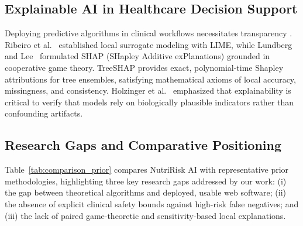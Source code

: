 \documentclass[conference]{IEEEtran}
\begin{document}
\subsection{Explainable AI in Healthcare Decision Support}
Deploying predictive algorithms in clinical workflows necessitates transparency \cite{topol2019high, amann2020explainability}. Ribeiro et al.~\cite{ribeiro2016why} established local surrogate modeling with LIME, while Lundberg and Lee~\cite{lundberg2017unified} formulated SHAP (SHapley Additive exPlanations) grounded in cooperative game theory. TreeSHAP provides exact, polynomial-time Shapley attributions for tree ensembles, satisfying mathematical axioms of local accuracy, missingness, and consistency. Holzinger et al.~\cite{holzinger2019causability} emphasized that explainability is critical to verify that models rely on biologically plausible indicators rather than confounding artifacts.

\subsection{Research Gaps and Comparative Positioning}
Table~\ref{tab:comparison_prior} compares NutriRisk AI with representative prior methodologies, highlighting three key research gaps addressed by our work: (i) the gap between theoretical algorithms and deployed, usable web software; (ii) the absence of explicit clinical safety bounds against high-risk false negatives; and (iii) the lack of paired game-theoretic and sensitivity-based local explanations.
\end{document}
